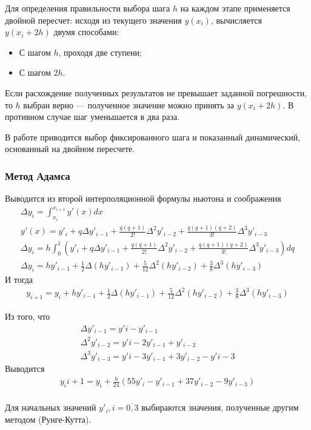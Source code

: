 Для определения правильности выбора шага \(h\) на каждом этапе применяется двойной пересчет: исходя из текущего значения \(y(x_i)\), вычисляется \(y(x_i + 2h)\) двумя способами:
\begin{itemize}
	\item С шагом \(h\), проходя две ступени;
	\item С шагом \(2h\).
\end{itemize}
Если расхождение полученных результатов не превышает заданной погрешности, то \(h\) выбран верно --- полученное значение можно принять за \(y(x_i + 2h)\). В противном случае шаг уменьшается в два раза.

В работе приводится выбор фиксированного шага и показанный динамический, основанный на двойном пересчете.

\subsubsection{Метод Адамса}
Выводится из второй интерполяционной формулы ньютона и соображения
\begin{align}
	\Delta y_i = \int_{x_i}^{x_{i+1}} y'(x) dx                                                                                                         \\
	y'(x) = y'_i + q \Delta y'_{i-1} + \frac{q(q + 1)}{2!} \Delta^2 y'_{i-2} + \frac{q(q+1)(q+2)}{3!}\Delta^3 y'_{i-3}                                 \\
	\Delta y_i = h \int_0^1\left( y'_i + q \Delta y'_{i-1} + \frac{q(q + 1)}{2!} \Delta^2 y'_{i-2} + \frac{q(q+1)(q+2)}{3!}\Delta^3 y'_{i-3}\right) dq \\
	\Delta y_i = hy'_{i-1} + \frac{1}{2}\Delta(h y'_{i-1}) + \frac{5}{12}\Delta^2(hy'_{i-2}) + \frac{3}{8}\Delta^3(hy'_{i-3})
\end{align}
И тогда
\begin{align}
	y_{i+1} = y_i + hy'_{i-1} + \frac{1}{2}\Delta(h y'_{i-1}) + \frac{5}{12}\Delta^2(hy'_{i-2}) + \frac{3}{8}\Delta^3(hy'_{i-3})
\end{align}

Из того, что
\begin{align*}
	\Delta y'_{i-1} = y'i - y'_{i-1}               \\
	\Delta^2 y'_{i-2} = y'i - 2y'_{i-1} + y'_{i-2} \\
	\Delta^3 y'_{i-3} = y'i - 3y'_{i-1} + 3y'_{i-2} - y'{i-3}
\end{align*}
Выводится
\begin{align}
	y_i{i+1} = y_i + \frac{h}{24}(55 y'_i - y'_{i-1} + 37 y'_{i - 2} - 9 y'_{i-3}) \\
\end{align}

Для начальных значений \(y'_i, i = \overline{0, 3}\) выбираются значения, полученные другим методом (Рунге-Кутта).

